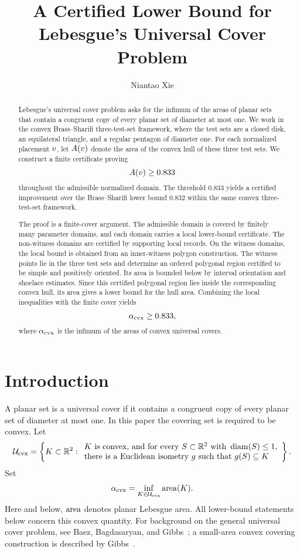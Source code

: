 \documentclass[11pt]{article}
\title{A Certified Lower Bound for Lebesgue's Universal Cover Problem}
\author{Niantao Xie}
\date{}
\begin{document}
\maketitle

\begin{abstract}
Lebesgue's universal cover problem asks for the infimum of the areas of planar sets that contain a congruent copy of every planar set of diameter at most one.  We work in the convex Brass--Sharifi three-test-set framework, where the test sets are a closed disk, an equilateral triangle, and a regular pentagon of diameter one.  For each normalized placement \(v\), let \(A(v)\) denote the area of the convex hull of these three test sets.  We construct a finite certificate proving
\[
A(v)\ge 0.833
\]
throughout the admissible normalized domain.  The threshold \(0.833\) yields a certified improvement over the Brass--Sharifi lower bound \(0.832\) within the same convex three-test-set framework.

The proof is a finite-cover argument.  The admissible domain is covered by finitely many parameter domains, and each domain carries a local lower-bound certificate.  The non-witness domains are certified by supporting local records.  On the witness domains, the local bound is obtained from an inner-witness polygon construction.  The witness points lie in the three test sets and determine an ordered polygonal region certified to be simple and positively oriented.  Its area is bounded below by interval orientation and shoelace estimates.  Since this certified polygonal region lies inside the corresponding convex hull, its area gives a lower bound for the hull area.  Combining the local inequalities with the finite cover yields
\[
\alpha_{\mathrm{cvx}}\ge 0.833,
\]
where \(\alpha_{\mathrm{cvx}}\) is the infimum of the areas of convex universal covers.
\end{abstract}

\section{Introduction}

A planar set is a universal cover if it contains a congruent copy of every planar set of diameter at most one.  In this paper the covering set is required to be convex.  Let
\[
\mathcal{U}_{\mathrm{cvx}}=
\left\{K\subset\mathbb{R}^2:
\begin{array}{l}
K\text{ is convex, and for every }S\subset\mathbb{R}^2\text{ with }\operatorname{diam}(S)\le 1,\\
\text{there is a Euclidean isometry }g\text{ such that }g(S)\subseteq K
\end{array}
\right\}.
\]
Set
\[
\alpha_{\mathrm{cvx}}=\inf_{K\in\mathcal{U}_{\mathrm{cvx}}}\operatorname{area}(K).
\]
Here and below, \(\operatorname{area}\) denotes planar Lebesgue area.  All lower-bound statements below concern this convex quantity.  For background on the general universal cover problem, see Baez, Bagdasaryan, and Gibbs~\cite{baez-bagdasaryan-gibbs}; a small-area convex covering construction is described by Gibbs~\cite{gibbs}.
\end{document}
